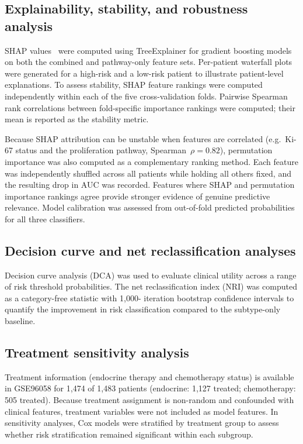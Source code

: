 \documentclass[review,12pt]{elsarticle}
\begin{document}
\subsection{Explainability, stability, and robustness analysis}
\label{sec:shap}

SHAP values~\citep{lundberg2017} were computed using TreeExplainer for
gradient boosting models on both the combined and pathway-only feature
sets.  Per-patient waterfall plots were generated for a high-risk and a
low-risk patient to illustrate patient-level explanations.  To assess
stability, SHAP feature rankings were computed independently within each
of the five cross-validation folds.  Pairwise Spearman rank correlations
between fold-specific importance rankings were computed; their mean is
reported as the stability metric.

Because SHAP attribution can be unstable when features are correlated
(e.g.\ Ki-67 status and the proliferation pathway, Spearman~$\rho = 0.82$), permutation importance was also computed as a
complementary ranking method.  Each feature was independently shuffled
across all patients while holding all others fixed, and the resulting
drop in AUC was recorded.  Features where SHAP and permutation
importance rankings agree provide stronger evidence of genuine predictive
relevance.  Model calibration was assessed from out-of-fold predicted
probabilities for all three classifiers.

\subsection{Decision curve and net reclassification analyses}
\label{sec:dca}

Decision curve analysis (DCA) was used to evaluate clinical utility
across a range of risk threshold probabilities.  The net reclassification
index (NRI) was computed as a category-free statistic with 1,000-
iteration bootstrap confidence intervals to quantify the improvement in
risk classification compared to the subtype-only baseline.

\subsection{Treatment sensitivity analysis}
\label{sec:treatment}

Treatment information (endocrine therapy and chemotherapy status) is
available in GSE96058 for 1,474 of 1,483 patients (endocrine: 1,127
treated; chemotherapy: 505 treated).  Because treatment assignment is
non-random and confounded with clinical features, treatment variables
were not included as model features.  In sensitivity analyses, Cox
models were stratified by treatment group to assess whether risk
stratification remained significant within each subgroup.
\end{document}
